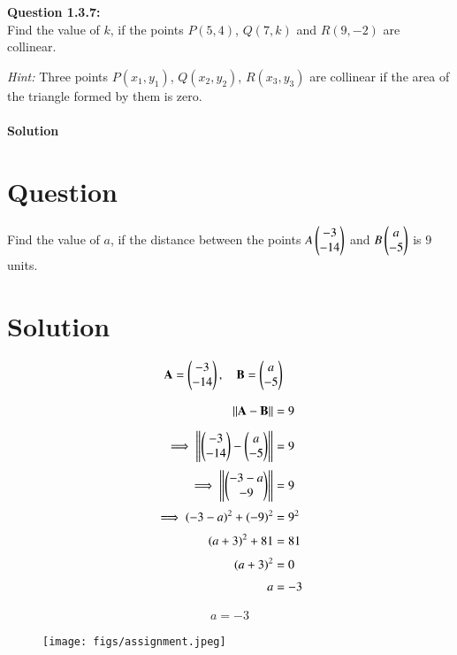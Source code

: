 \documentclass[journal]{IEEEtran}
\begin{document}

\textbf{Question 1.3.7:} \\
\textbf{} Find the value of $k$, if the points $P(5,4)$, $Q(7,k)$ and $R(9,-2)$ are collinear. 

\textit{Hint:} Three points $P(x_1,y_1)$, $Q(x_2,y_2)$, $R(x_3,y_3)$ are collinear if the area of the triangle formed by them is zero.\\
\\

\textbf{Solution}



\section*{Question}
Find the value of $a$, if the distance between the points 
$A\begin{pmatrix}-3\\-14\end{pmatrix}$ and $B\begin{pmatrix}a\\-5\end{pmatrix}$ is $9$ units.

\section*{Solution}
\begin{align}
\mathbf{A} &= \begin{pmatrix}-3\\-14\end{pmatrix}, \quad
\mathbf{B} = \begin{pmatrix}a\\-5\end{pmatrix}
\end{align}

\begin{align}
\|\mathbf{A}-\mathbf{B}\| &= 9 \\[2mm]
\implies \left\|\begin{pmatrix}-3\\-14\end{pmatrix} - \begin{pmatrix}a\\-5\end{pmatrix}\right\| &= 9 \\[1mm]
\implies \left\|\begin{pmatrix}-3-a\\-9\end{pmatrix}\right\| &= 9 \\[1mm]
\implies (-3-a)^2 + (-9)^2 &= 9^2 \\[1mm]
(a+3)^2 + 81 &= 81 \\[1mm]
(a+3)^2 &= 0 \\[1mm]
a &= -3
\end{align}

\begin{align}
\boxed{\,a = -3\,}
\end{align}
\newpage
\begin{figure}
    \centering
\texttt{[image: figs/assignment.jpeg]}
    \caption{}
    \label{fig:placeholder}
\end{figure}
\end{document}
